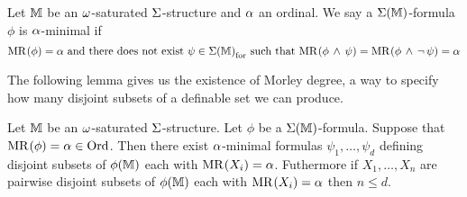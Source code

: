 \begin{dfn}[$\al$-minimality]
    Let $\mathbb{M}$ be an $\omega$-saturated $\Sigma$-structure and $\al$ an ordinal.
    We say a $\Sigma(\mathbb{M})$-formula $\phi$ is $\al$-minimal if 
    \[\mathrm{MR}^{}(\phi) = \alpha \text{ and there does not exist } 
    \psi \in {\Sigma(\mathbb{M})}_\mathrm{for} \text{ such that } 
    \mathrm{MR}^{}(\phi \, \land \, \psi) = \mathrm{MR}^{}(\phi \, \land \, \neg\, \psi) = \alpha\]
\end{dfn}

The following lemma gives us the existence of Morley degree,
a way to specify how many disjoint subsets of a definable set we can produce.
\begin{lem}
    Let $\mathbb{M}$ be an $\omega$-saturated $\Sigma$-structure.
    Let $\phi$ be a $\Sigma(\mathbb{M})$-formula.
    Suppose that $\mathrm{MR}^{}(\phi) = \alpha \in \operatorname{Ord}$.
    Then there exist $\al$-minimal formulas $\psi_1,\dots,\psi_d$ 
    defining disjoint subsets of $\phi(\mathbb{M})$
    each with $\mathrm{MR}^{}(X_i) = \alpha$.
    Futhermore if $X_1,\dots,X_n$ are 
    pairwise disjoint subsets of $\phi(\mathbb{M})$ 
    each with $\mathrm{MR}^{}(X_i) = \alpha$ then $n \le d$.
\end{lem}
